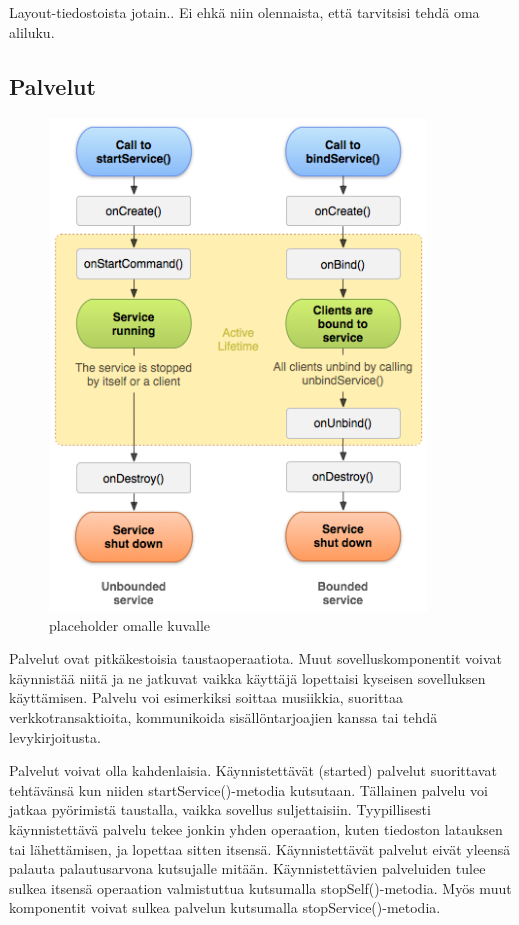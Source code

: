 Layout-tiedostoista jotain.. Ei ehkä niin olennaista, että tarvitsisi tehdä oma aliluku.  \cite{android}

\subsection{Palvelut}

\begin{figure}[htb]
\includegraphics[width=100mm]{service_lifecycle.png}
\caption{placeholder omalle kuvalle} \label{service_lifecycle}
\end{figure}

Palvelut ovat pitkäkestoisia taustaoperaatiota. Muut sovelluskomponentit voivat käynnistää niitä ja ne jatkuvat vaikka käyttäjä lopettaisi kyseisen sovelluksen käyttämisen. Palvelu voi esimerkiksi soittaa musiikkia, suorittaa verkkotransaktioita, kommunikoida sisällöntarjoajien kanssa tai tehdä levykirjoitusta.

Palvelut voivat olla kahdenlaisia. Käynnistettävät (started) palvelut suorittavat tehtävänsä kun niiden startService()-metodia kutsutaan. Tällainen palvelu voi jatkaa pyörimistä taustalla, vaikka sovellus suljettaisiin. Tyypillisesti käynnistettävä palvelu tekee jonkin yhden operaation, kuten tiedoston latauksen tai lähettämisen, ja lopettaa sitten itsensä. Käynnistettävät palvelut eivät yleensä palauta palautusarvona kutsujalle mitään. Käynnistettävien palveluiden tulee sulkea itsensä operaation valmistuttua kutsumalla stopSelf()-metodia. Myös muut komponentit voivat sulkea palvelun kutsumalla stopService()-metodia.


